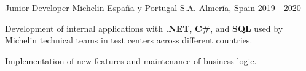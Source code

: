   \cventry
    {Junior Developer}
    {Michelin España y Portugal S.A.}
  {Almería, Spain}
  {2019 - 2020}
  {
    \begin{cvitems}
      \item {Development of internal applications with \textbf{.NET}, \textbf{C\#}, and \textbf{SQL} used by Michelin technical teams in test centers across different countries.}
      \item {Implementation of new features and maintenance of business logic.}
    \end{cvitems}
  }
